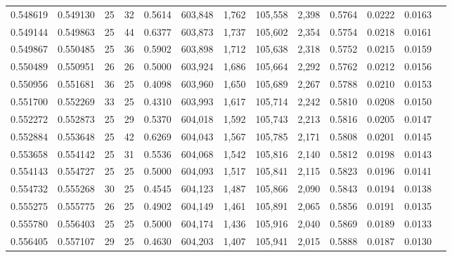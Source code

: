 \begin{tabular}{rrrrrrrrrrrrr}
0.548619 & 0.549130 &    25 &  32 &                                     0.5614 & 603,848 &   1,762 & 105,558 &   2,398 & 0.5764 & 0.0222 & 0.0163 \\
0.549144 & 0.549863 &    25 &  44 &                                     0.6377 & 603,873 &   1,737 & 105,602 &   2,354 & 0.5754 & 0.0218 & 0.0161 \\
0.549867 & 0.550485 &    25 &  36 &                                     0.5902 & 603,898 &   1,712 & 105,638 &   2,318 & 0.5752 & 0.0215 & 0.0159 \\
0.550489 & 0.550951 &    26 &  26 &                                     0.5000 & 603,924 &   1,686 & 105,664 &   2,292 & 0.5762 & 0.0212 & 0.0156 \\
0.550956 & 0.551681 &    36 &  25 &                                     0.4098 & 603,960 &   1,650 & 105,689 &   2,267 & 0.5788 & 0.0210 & 0.0153 \\
0.551700 & 0.552269 &    33 &  25 &                                     0.4310 & 603,993 &   1,617 & 105,714 &   2,242 & 0.5810 & 0.0208 & 0.0150 \\
0.552272 & 0.552873 &    25 &  29 &                                     0.5370 & 604,018 &   1,592 & 105,743 &   2,213 & 0.5816 & 0.0205 & 0.0147 \\
0.552884 & 0.553648 &    25 &  42 &                                     0.6269 & 604,043 &   1,567 & 105,785 &   2,171 & 0.5808 & 0.0201 & 0.0145 \\
0.553658 & 0.554142 &    25 &  31 &                                     0.5536 & 604,068 &   1,542 & 105,816 &   2,140 & 0.5812 & 0.0198 & 0.0143 \\
0.554143 & 0.554727 &    25 &  25 &                                     0.5000 & 604,093 &   1,517 & 105,841 &   2,115 & 0.5823 & 0.0196 & 0.0141 \\
0.554732 & 0.555268 &    30 &  25 &                                     0.4545 & 604,123 &   1,487 & 105,866 &   2,090 & 0.5843 & 0.0194 & 0.0138 \\
0.555275 & 0.555775 &    26 &  25 &                                     0.4902 & 604,149 &   1,461 & 105,891 &   2,065 & 0.5856 & 0.0191 & 0.0135 \\
0.555780 & 0.556403 &    25 &  25 &                                     0.5000 & 604,174 &   1,436 & 105,916 &   2,040 & 0.5869 & 0.0189 & 0.0133 \\
0.556405 & 0.557107 &    29 &  25 &                                     0.4630 & 604,203 &   1,407 & 105,941 &   2,015 & 0.5888 & 0.0187 & 0.0130 \\

\end{tabular}

